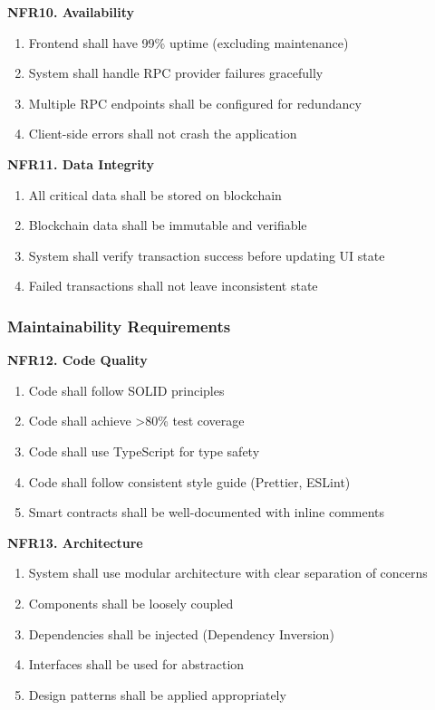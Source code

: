 \documentclass[a4paper,13pt,twoside]{report}
\theoremstyle{definition}
\begin{document}
\textbf{NFR10. Availability}

\begin{enumerate}
    \item Frontend shall have 99\% uptime (excluding maintenance)
    \item System shall handle RPC provider failures gracefully
    \item Multiple RPC endpoints shall be configured for redundancy
    \item Client-side errors shall not crash the application
\end{enumerate}

\textbf{NFR11. Data Integrity}

\begin{enumerate}
    \item All critical data shall be stored on blockchain
    \item Blockchain data shall be immutable and verifiable
    \item System shall verify transaction success before updating UI state
    \item Failed transactions shall not leave inconsistent state
\end{enumerate}

\subsubsection{Maintainability Requirements}

\textbf{NFR12. Code Quality}

\begin{enumerate}
    \item Code shall follow SOLID principles
    \item Code shall achieve >80\% test coverage
    \item Code shall use TypeScript for type safety
    \item Code shall follow consistent style guide (Prettier, ESLint)
    \item Smart contracts shall be well-documented with inline comments
\end{enumerate}

\textbf{NFR13. Architecture}

\begin{enumerate}
    \item System shall use modular architecture with clear separation of concerns
    \item Components shall be loosely coupled
    \item Dependencies shall be injected (Dependency Inversion)
    \item Interfaces shall be used for abstraction
    \item Design patterns shall be applied appropriately
\end{enumerate}
\end{document}
